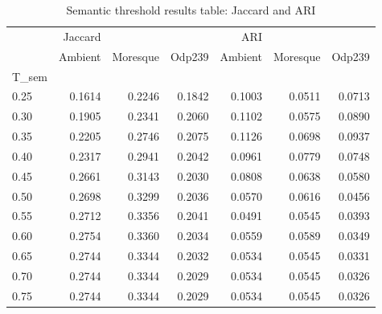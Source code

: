 \documentclass[a4paper, 12pt, oneside]{Thesis} %
\begin{document}
\begin{table}[th]
\centering
\begin{tabular}{l|rrr|rrr}
\toprule
{} & Jaccard &          &        &     ARI &          &        \\
 & Ambient & Moresque & Odp239 & Ambient & Moresque & Odp239 \\
T_{sem} &         &          &        &         &          &        \\
\midrule
0.25  &  0.1614 &   0.2246 & 0.1842 &  0.1003 &   0.0511 & 0.0713 \\
0.30  &  0.1905 &   0.2341 & 0.2060 &  0.1102 &   0.0575 & 0.0890 \\
0.35  &  0.2205 &   0.2746 & 0.2075 &  0.1126 &   0.0698 & 0.0937 \\
0.40  &  0.2317 &   0.2941 & 0.2042 &  0.0961 &   0.0779 & 0.0748 \\
0.45  &  0.2661 &   0.3143 & 0.2030 &  0.0808 &   0.0638 & 0.0580 \\
0.50  &  0.2698 &   0.3299 & 0.2036 &  0.0570 &   0.0616 & 0.0456 \\
0.55  &  0.2712 &   0.3356 & 0.2041 &  0.0491 &   0.0545 & 0.0393 \\
0.60  &  0.2754 &   0.3360 & 0.2034 &  0.0559 &   0.0589 & 0.0349 \\
0.65  &  0.2744 &   0.3344 & 0.2032 &  0.0534 &   0.0545 & 0.0331 \\
0.70  &  0.2744 &   0.3344 & 0.2029 &  0.0534 &   0.0545 & 0.0326 \\
0.75  &  0.2744 &   0.3344 & 0.2029 &  0.0534 &   0.0545 & 0.0326 \\
\bottomrule
\end{tabular}
\caption{Semantic threshold results table: Jaccard and ARI}
\label{tab:semparamtablep1}
\end{table}
\end{document}
